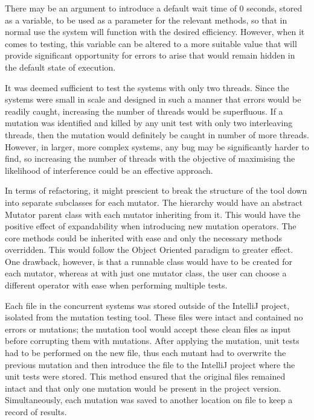 \documentclass[a4paper,12pt]{article}
\begin{document}
There may be an argument to introduce a default wait time of 0 seconds, stored as a variable, to be used as a parameter for the relevant methods, so that in normal use the system will function with the desired efficiency. However, when it comes to testing, this variable can be altered to a more suitable value that will provide significant opportunity for errors to arise that would remain hidden in the default state of execution. 

It was deemed sufficient to test the systems with only two threads. Since the systems were small in scale and designed in such a manner that errors would be readily caught, increasing the number of threads would be superfluous. If a mutation was identified and killed by any unit test with only two interleaving threads, then the mutation would definitely be caught in number of more threads. However, in larger, more complex systems, any bug may be significantly harder to find, so increasing the number of threads with the objective of maximising the likelihood of interference could be an effective approach.

In terms of refactoring, it might prescient to break the structure of the tool down into separate subclasses for each mutator. The hierarchy would have an abstract Mutator parent class with each mutator inheriting from it. This would have the positive effect of expandability when introducing new mutation operators. The core methods could be inherited with ease and only the necessary methods overridden. This would follow the Object Oriented paradigm to greater effect. One drawback, however, is that a runnable class would have to be created for each mutator, whereas at with just one mutator class, the user can choose a different operator with ease when performing multiple tests.

Each file in the concurrent systems was stored outside of the IntelliJ project, isolated from the mutation testing tool. These files were intact and contained no errors or mutations; the mutation tool would accept these clean files as input before corrupting them with mutations. After applying the mutation, unit tests had to be performed on the new file, thus each mutant had to overwrite the previous mutation and then introduce the file to the IntelliJ project where the unit tests were stored. This method ensured that the original files remained intact and that only one mutation would be present in the project version. Simultaneously, each mutation was saved to another location on file to keep a record of results. 
\end{document}
